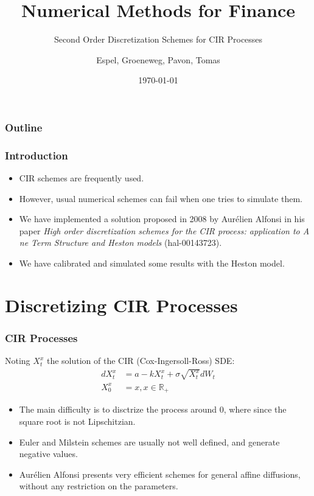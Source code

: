 \documentclass[12pt]{beamer}
\title{Numerical Methods for Finance}
\subtitle{Second Order Discretization Schemes for CIR Processes}
\author{Espel, Groeneweg, Pavon, Tomas}
\institute{Imperial College London}
\date{\today}
\begin{document}
\begin{frame}
    \titlepage
\end{frame}


\begin{frame}
\frametitle{Outline}
\tableofcontents
\end{frame}

\begin{frame}
\frametitle{Introduction}
\begin{itemize}
  \item CIR schemes are frequently used.
  \item However, usual numerical schemes can fail when one tries to simulate them.
  \item We have implemented a solution proposed in 2008 by Aurélien Alfonsi in his paper \textit{High order discretization schemes for the CIR process: application to A ne Term Structure and Heston models} (hal-00143723).
  \item We have calibrated and simulated some results with the Heston model.
\end{itemize}
\end{frame}


\section{Discretizing CIR Processes}
\frame{\tableofcontents[currentsection]}

\begin{frame}
\frametitle{CIR Processes}
Noting $X^{x}_{t}$ the solution of the CIR (Cox-Ingersoll-Ross) SDE:
\begin{align*}
dX^{x}_{t} & = a - kX^{x}_{t} + \sigma \sqrt{X^{x}_{t}} dW_{t} \\
X^{x}_{0} & = x, x \in \mathbb{R_{+}}
\end{align*}
\begin{itemize}
  \item The main difficulty is to disctrize the process around 0, where since the square root is not Lipschitzian.
  \item Euler and Milstein schemes are usually not well defined, and generate negative values.
  \item Aurélien Alfonsi presents very efficient schemes for general affine diffusions, without any restriction on the parameters.
\end{itemize}
\end{frame}
\end{document}
